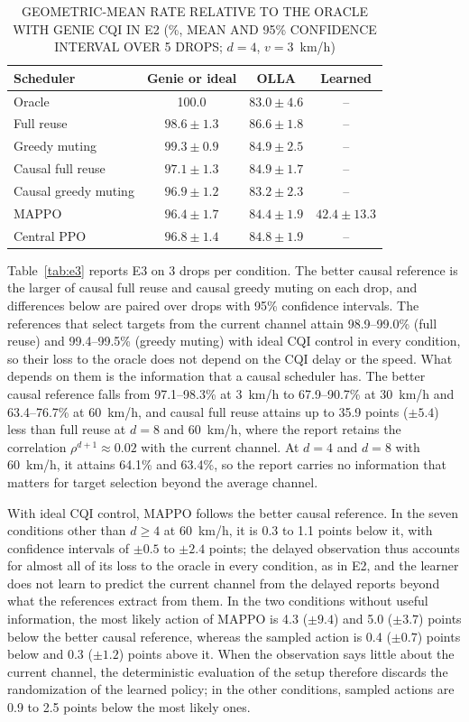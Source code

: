 \documentclass{ieeeaccess}
\begin{document}
\begin{table}
\caption{GEOMETRIC-MEAN RATE RELATIVE TO THE ORACLE WITH GENIE CQI IN E2 (\%, MEAN AND 95\% CONFIDENCE INTERVAL OVER 5 DROPS; $d = 4$, $v = 3$~km/h)}
\label{tab:e2}
\centering
\begin{tabular}{lccc}
\toprule
Scheduler & Genie or ideal & OLLA & Learned \\
\midrule
Oracle & 100.0 & $83.0 \pm 4.6$ & -- \\
Full reuse & $98.6 \pm 1.3$ & $86.6 \pm 1.8$ & -- \\
Greedy muting & $99.3 \pm 0.9$ & $84.9 \pm 2.5$ & -- \\
Causal full reuse & $97.1 \pm 1.3$ & $84.9 \pm 1.7$ & -- \\
Causal greedy muting & $96.9 \pm 1.2$ & $83.2 \pm 2.3$ & -- \\
MAPPO & $96.4 \pm 1.7$ & $84.4 \pm 1.9$ & $42.4 \pm 13.3$ \\
Central PPO & $96.8 \pm 1.4$ & $84.8 \pm 1.9$ & -- \\
\bottomrule
\end{tabular}
\end{table}

Table~\ref{tab:e3} reports E3 on 3 drops per condition. The better causal reference is the larger of causal full reuse and causal greedy muting on each drop, and differences below are paired over drops with 95\% confidence intervals. The references that select targets from the current channel attain 98.9--99.0\% (full reuse) and 99.4--99.5\% (greedy muting) with ideal CQI control in every condition, so their loss to the oracle does not depend on the CQI delay or the speed. What depends on them is the information that a causal scheduler has. The better causal reference falls from 97.1--98.3\% at 3~km/h to 67.9--90.7\% at 30~km/h and 63.4--76.7\% at 60~km/h, and causal full reuse attains up to 35.9 points ($\pm 5.4$) less than full reuse at $d = 8$ and 60~km/h, where the report retains the correlation $\rho^{d+1} \approx 0.02$ with the current channel. At $d = 4$ and $d = 8$ with 60~km/h, it attains 64.1\% and 63.4\%, so the report carries no information that matters for target selection beyond the average channel.

With ideal CQI control, MAPPO follows the better causal reference. In the seven conditions other than $d \ge 4$ at 60~km/h, it is 0.3 to 1.1 points below it, with confidence intervals of $\pm 0.5$ to $\pm 2.4$ points; the delayed observation thus accounts for almost all of its loss to the oracle in every condition, as in E2, and the learner does not learn to predict the current channel from the delayed reports beyond what the references extract from them. In the two conditions without useful information, the most likely action of MAPPO is 4.3 ($\pm 9.4$) and 5.0 ($\pm 3.7$) points below the better causal reference, whereas the sampled action is 0.4 ($\pm 0.7$) points below and 0.3 ($\pm 1.2$) points above it. When the observation says little about the current channel, the deterministic evaluation of the setup therefore discards the randomization of the learned policy; in the other conditions, sampled actions are 0.9 to 2.5 points below the most likely ones.
\end{document}
